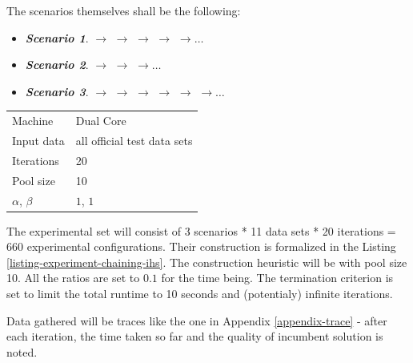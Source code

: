 The scenarios themselves shall be the following:

\begin{itemize}
	\item \textit{\textbf{Scenario 1}}.  $\rightarrow$  $\rightarrow$  $\rightarrow$  $\rightarrow$  $\rightarrow \ldots$
	\item \textit{\textbf{Scenario 2}}.  $\rightarrow$  $\rightarrow$  $\rightarrow \ldots$
	\item \textit{\textbf{Scenario 3}}.  $\rightarrow$  $\rightarrow$  $\rightarrow$  $\rightarrow$  $\rightarrow$  $\rightarrow \ldots$
\end{itemize}

\begin{center}
\bigskip
\begin{tabular}{| l | l |}
  \hline
  \hline
  Machine           & Dual Core \\
  Input data        & all official test data sets \\
  Iterations        & 20 \\
  Pool size         & 10 \\
  $\alpha$, $\beta$ & $1$, $1$ \\
  \hline
\end{tabular}
\bigskip
\end{center}

The experimental set will consist of 3 scenarios * 11 data sets * 20 iterations = 660 experimental configurations. Their construction is formalized in the Listing \ref{listing-experiment-chaining-ihs}. The construction heuristic will be  with pool size 10. All the ratios are set to $0.1$ for the time being. The termination criterion is set to limit the total runtime to 10 seconds and (potentialy) infinite iterations.

Data gathered will be traces like the one in Appendix \ref{appendix-trace} - after each iteration, the time taken so far and the quality of incumbent solution is noted.

